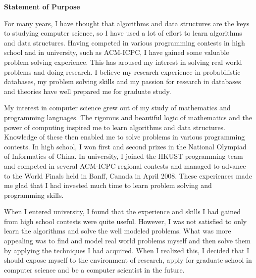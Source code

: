 \documentclass[10pt]{report}
\begin{document}
\begin{center}
\textbf{\large Statement of Purpose}
\end{center}

For many years, I have thought that algorithms and data structures are the keys to studying computer science, so I have used a lot of effort to learn algorithms and data structures. Having competed in various programming contests in high school and in university, such as ACM-ICPC, I have gained some valuable problem solving experience. This has aroused my interest in solving real world problems and doing research. I believe my research experience in probabilistic databases, my problem solving skills and my passion for research in databases and theories have well prepared me for graduate study. 

\vspace{0.2cm}
My interest in computer science grew out of my study of mathematics and programming languages. The rigorous and beautiful logic of mathematics and the power of computing inspired me to learn algorithms and data structures. Knowledge of these then enabled me to solve problems in various programming contests. In high school, I won first and second prizes in the National Olympiad of Informatics of China. In university, I joined the HKUST programming team and competed in several ACM-ICPC regional contests and managed to advance to the World Finals held in Banff, Canada in April 2008. These experiences made me glad that I had invested much time to learn problem solving and programming skills.

\vspace{0.2cm}
When I entered university, I found that the experience and skills I had gained from high school contests were quite useful. However, I was not satisfied to only learn the algorithms and solve the well modeled problems. What was more appealing was to find and model real world problems myself and then solve them by applying the techniques I had acquired. When I realized this, I decided that I should expose myself to the environment of research, apply for graduate school in computer science and be a computer scientist in the future.
\end{document}

